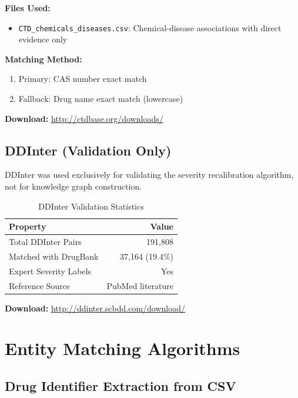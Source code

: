 \documentclass[11pt,a4paper]{article}
\begin{document}
\textbf{Files Used:}
\begin{itemize}
    \item \texttt{CTD\_chemicals\_diseases.csv}: Chemical-disease associations with direct evidence only
\end{itemize}

\textbf{Matching Method:} 
\begin{enumerate}
    \item Primary: CAS number exact match
    \item Fallback: Drug name exact match (lowercase)
\end{enumerate}

\textbf{Download:} \url{http://ctdbase.org/downloads/}

\subsection{DDInter (Validation Only)}
\label{sec:ddinter}

DDInter was used exclusively for validating the severity recalibration algorithm, not for knowledge graph construction.

\begin{table}[h]
\centering
\caption{DDInter Validation Statistics}
\begin{tabular}{@{}lr@{}}
\toprule
\textbf{Property} & \textbf{Value} \\
\midrule
Total DDInter Pairs & 191,808 \\
Matched with DrugBank & 37,164 (19.4\%) \\
Expert Severity Labels & Yes \\
Reference Source & PubMed literature \\
\bottomrule
\end{tabular}
\end{table}

\textbf{Download:} \url{http://ddinter.scbdd.com/download/}

\newpage
\section{Entity Matching Algorithms}

\subsection{Drug Identifier Extraction from CSV}
\end{document}

